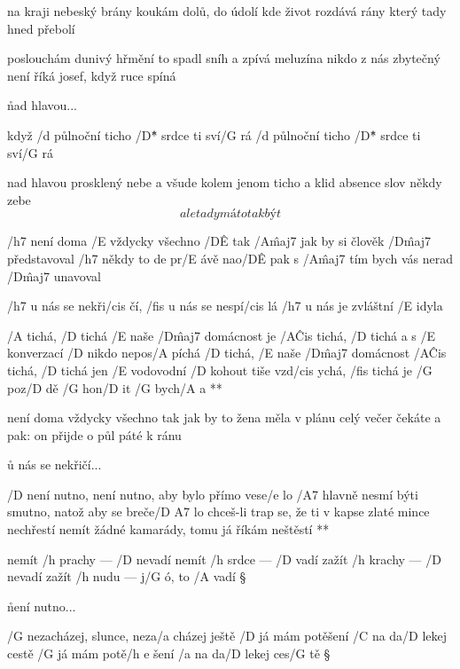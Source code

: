 na kraji nebeský brány
koukám dolů, do údolí
kde život rozdává rány
který tady hned přebolí \s

poslouchám dunivý hřmění
to spadl sníh a zpívá meluzína
nikdo z nás zbytečný není
říká josef, když ruce spíná \songgg

\r nad hlavou...

když /d půlnoční ticho /D\^{*} srdce ti sví/G rá
/d půlnoční ticho /D\^{*} srdce ti sví/G rá

\rr

nad hlavou prosklený nebe
a všude kolem jenom ticho a klid
absence slov někdy zebe
\[ ale tady má to tak být \]




/h7 není doma /E vždycky všechno /D\^E tak
/A\^{maj7} jak by si člověk /D\^{maj7} představoval
/h7 někdy to de pr/E ávě nao/D\^E pak
s /A\^{maj7} tím bych vás nerad /D\^{maj7} unavoval

\R  /h7 u nás se nekři/cis čí, /fis u nás se nespí/cis lá
    /h7 u nás je zvláštní /E idyla

    /A tichá, /D tichá /E naše /D\^{maj7} domácnost je /A\^{Cis} tichá, /D tichá
    a s /E konverzací /D nikdo nepos/A píchá
    /D tichá, /E naše /D\^{maj7} domácnost /A\^{Cis} tichá, /D tichá
    jen /E vodovodní /D kohout tiše vzd/cis ychá, /fis tichá
    je /G poz/D dě /G hon/D it /G bych/A a **

není doma vždycky všechno tak
jak by to žena měla v plánu
celý večer čekáte a pak:
on přijde o půl páté k ránu

\r u nás se nekřičí...




\R  /D není nutno, není nutno, aby bylo přímo vese/e lo
    /A7 hlavně nesmí býti smutno, natož aby se breče/{D A7} lo \s
    chceš-li trap se, že ti v kapse zlaté mince nechřestí
    nemít žádné kamarády, tomu já říkám neštěstí **

nemít /h prachy --- /D nevadí
nemít /h srdce --- /D vadí
zažít /h krachy --- /D nevadí
zažít /h nudu --- j/G ó, to /A vadí \S

\r není nutno...




/G nezacházej, slunce, neza/a cházej ještě
/D já mám potěšení /C na da/D lekej cestě
/G já mám potě/{h e} šení    /a na da/D lekej ces/G tě \S

